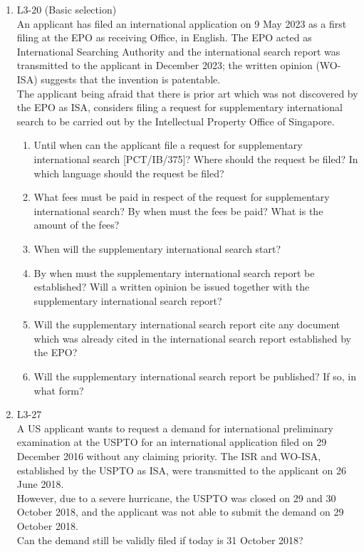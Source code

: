 \documentclass{report}
\begin{document}
\begin{enumerate}[label=\textbf{Answer \arabic*}]
    \item %
    L3-20 (Basic selection) \\
    An applicant has filed an international application on 9 May 2023 as a first filing at the EPO as receiving Office, in English. The EPO acted as International Searching Authority and the international search report was transmitted to the applicant in December 2023; the written opinion (WO-ISA) suggests that the invention is patentable. \\
    The applicant being afraid that there is prior art which was not discovered by the EPO as ISA, considers filing a request for supplementary international search to be carried out by the Intellectual Property Office of Singapore.
    \begin{enumerate}[label=(\alph*)]
        \item Until when can the applicant file a request for supplementary international search [PCT/IB/375]? Where should the request be filed? In which language should the request be filed?
        \item What fees must be paid in respect of the request for supplementary international search? By when must the fees be paid? What is the amount of the fees?
        \item When will the supplementary international search start?
        \item By when must the supplementary international search report be established? Will a written opinion be issued together with the supplementary international search report?
        \item Will the supplementary international search report cite any document which was already cited in the international search report established by the EPO?
        \item Will the supplementary international search report be published? If so, in what form?
    \end{enumerate}

    \item %
    L3-27 \\
    A US applicant wants to request a demand for international preliminary examination at the USPTO for an international application filed on 29 December 2016 without any claiming priority. The ISR and WO-ISA, established by the USPTO as ISA, were transmitted to the applicant on 26 June 2018. \\
    However, due to a severe hurricane, the USPTO was closed on 29 and 30 October 2018, and the applicant was not able to submit the demand on 29 October 2018. \\
    Can the demand still be validly filed if today is 31 October 2018?


\end{enumerate}
\end{document}
